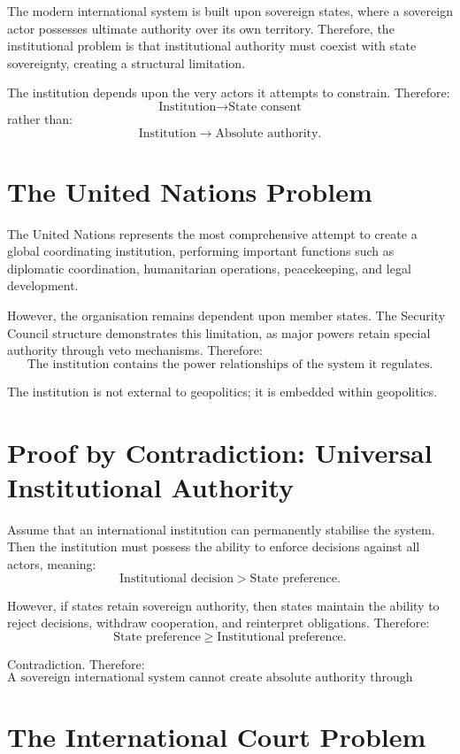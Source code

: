 \documentclass[11pt,openany]{book}
\theoremstyle{plain}
\theoremstyle{definition}
\begin{document}
The modern international system is built upon sovereign states, where a sovereign actor possesses ultimate authority over its own territory. Therefore, the institutional problem is that institutional authority must coexist with state sovereignty, creating a structural limitation. 

The institution depends upon the very actors it attempts to constrain. Therefore:
\[
\text{Institution} \longrightarrow \text{State consent}
\]
rather than:
\[
\text{Institution} \longrightarrow \text{Absolute authority}.
\]

\section*{The United Nations Problem}

The United Nations represents the most comprehensive attempt to create a global coordinating institution, performing important functions such as diplomatic coordination, humanitarian operations, peacekeeping, and legal development. 

However, the organisation remains dependent upon member states. The Security Council structure demonstrates this limitation, as major powers retain special authority through veto mechanisms. Therefore:
\[
\text{The institution contains the power relationships of the system it regulates.}
\]

The institution is not external to geopolitics; it is embedded within geopolitics.

\section*{Proof by Contradiction: Universal Institutional Authority}

Assume that an international institution can permanently stabilise the system. Then the institution must possess the ability to enforce decisions against all actors, meaning:
\[
\text{Institutional decision} > \text{State preference}.
\]

However, if states retain sovereign authority, then states maintain the ability to reject decisions, withdraw cooperation, and reinterpret obligations. Therefore:
\[
\text{State preference} \geq \text{Institutional preference}.
\]

Contradiction. Therefore:
\[
\boxed{
\text{A sovereign international system cannot create absolute authority through institutions alone.}
}
\]

\section*{The International Court Problem}
\end{document}
